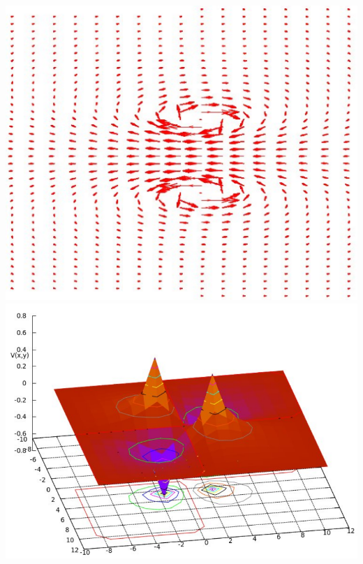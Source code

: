 \documentclass[../resume.tex]{subfiles}
\begin{document}
\noindent
\includegraphics[scale=0.3]{../scientific/magnetic_field.png} 
\includegraphics[scale=0.2]{../scientific/poisson2.png} 
\end{document}
